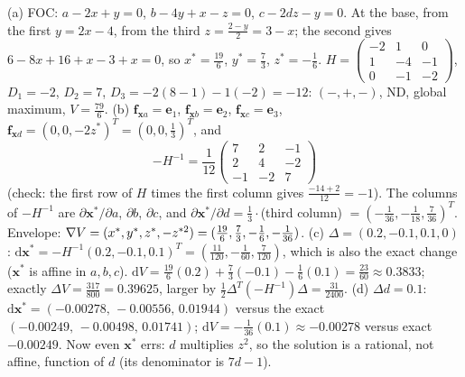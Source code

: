 \begin{solutions}
  \item (a) FOC: $a-2x+y=0$, $b-4y+x-z=0$, $c-2dz-y=0$. At the base,
        from the first $y=2x-4$, from the third $z=\tfrac{2-y}{2}=3-x$; the
        second gives $6-8x+16+x-3+x=0$, so $x^*=\tfrac{19}{6}$,
        $y^*=\tfrac73$, $z^*=-\tfrac16$. $H=\begin{pmatrix}-2&1&0\\1&-4&-1\\0&-1&-2\end{pmatrix}$,
        $D_1=-2$, $D_2=7$, $D_3=-2(8-1)-1(-2)=-12$: $(-,+,-)$, ND, global
        maximum, $V=\tfrac{79}{6}$.
        (b) $\mathbf{f}_{\mathbf{x}a}=\mathbf{e}_1$,
        $\mathbf{f}_{\mathbf{x}b}=\mathbf{e}_2$,
        $\mathbf{f}_{\mathbf{x}c}=\mathbf{e}_3$,
        $\mathbf{f}_{\mathbf{x}d}=(0,0,-2z^*)^{T}=(0,0,\tfrac13)^{T}$, and
        \[
          -H^{-1}=\frac1{12}\begin{pmatrix}7&2&-1\\2&4&-2\\-1&-2&7\end{pmatrix}
        \]
        (check: the first row of $H$ times the first column gives
        $\tfrac{-14+2}{12}=-1$). The columns of $-H^{-1}$ are
        $\partial\mathbf{x}^*/\partial a$, $\partial b$, $\partial c$, and
        $\partial\mathbf{x}^*/\partial d=\tfrac13\cdot$(third column)
        $=(-\tfrac1{36},-\tfrac1{18},\tfrac7{36})^{T}$. Envelope:
        $\nabla V=(x^*,y^*,z^*,-z^{*2})=(\tfrac{19}6,\tfrac73,-\tfrac16,-\tfrac1{36})$.
        (c) $\Delta=(0.2,-0.1,0.1,0)$:
        $\mathrm{d}\mathbf{x}^*=-H^{-1}(0.2,-0.1,0.1)^{T}
        =(\tfrac{11}{120},-\tfrac1{60},\tfrac7{120})$, which is also the
        exact change ($\mathbf{x}^*$ is affine in $a,b,c$).
        $\mathrm{d}V=\tfrac{19}{6}(0.2)+\tfrac73(-0.1)-\tfrac16(0.1)=\tfrac{23}{60}
        \approx0.3833$; exactly $\Delta V=\tfrac{317}{800}=0.39625$, larger
        by $\tfrac12\Delta^{T}(-H^{-1})\Delta=\tfrac{31}{2400}$.
        (d) $\Delta d=0.1$:
        $\mathrm{d}\mathbf{x}^*=(-0.00278,\,-0.00556,\,0.01944)$ versus the
        exact $(-0.00249,\,-0.00498,\,0.01741)$;
        $\mathrm{d}V=-\tfrac1{36}(0.1)\approx-0.00278$ versus exact
        $-0.00249$. Now even $\mathbf{x}^*$ errs: $d$ multiplies $z^{2}$, so
        the solution is a rational, not affine, function of $d$
        (its denominator is $7d-1$).


\end{solutions}
